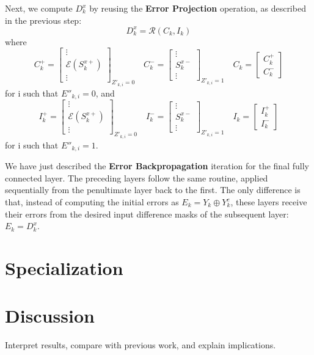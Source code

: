 \documentclass{article}
\theoremstyle{definition}
\theoremstyle{remark}
\begin{document}
Next, we compute \( D^x_k \) by reusing the \textbf{Error Projection} operation, as described in the previous step:
\[
    D^x_k = \mathcal{R}(C_k, I_k)
\]
where
\[
    C^+_k = \begin{bmatrix} \vdots \\ \mathcal{E}(S^{x+}_k) \\ \vdots \end{bmatrix}_{Z'_{k,i} = 0} \quad
    C^-_k = \begin{bmatrix} \vdots \\ S^{x-}_k \\ \vdots \end{bmatrix}_{Z'_{k,i} = 1} \quad
    C_k = \begin{bmatrix} C^+_k \\ C^-_k \end{bmatrix}
\]
for i such that \( E''_{k,i} = 0 \), and
\[
    I^+_k = \begin{bmatrix} \vdots \\ \mathcal{E}(S^{x+}_k) \\ \vdots \end{bmatrix}_{Z'_{k,i} = 0} \quad
    I^-_k = \begin{bmatrix} \vdots \\ S^{x-}_k \\ \vdots \end{bmatrix}_{Z'_{k,i} = 1} \quad
    I_k = \begin{bmatrix} I^+_k \\ I^-_k \end{bmatrix}
\]
for i such that \( E''_{k,i} = 1 \).

We have just described the \textbf{Error Backpropagation} iteration for the final fully connected layer. The preceding layers follow the same routine, applied sequentially from the penultimate layer back to the first. The only difference is that, instead of computing the initial errors as \( E_k = Y_k \oplus Y^e_k \), these layers receive their errors from the desired input difference masks of the subsequent layer: \( E_k = D^x_k \).

\section{Specialization}

\section{Discussion}
Interpret results, compare with previous work, and explain implications.
\end{document}
